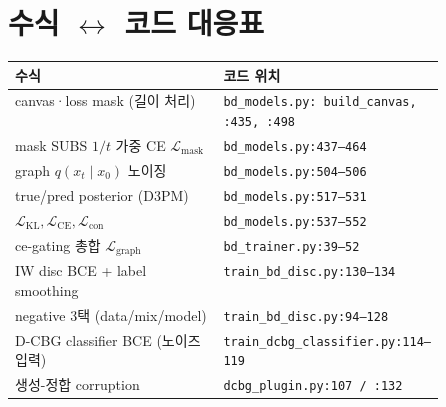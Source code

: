 \documentclass[11pt]{article}
\newcommand{\code}[1]{\texttt{\small #1}}
\newcommand{\xz}{x_0}
\newcommand{\xt}{x_t}
\theoremstyle{definition}
\begin{document}
\section{수식 $\leftrightarrow$ 코드 대응표}
\begin{center}
\renewcommand{\arraystretch}{1.2}
\begin{tabular}{@{}p{0.5\linewidth} l@{}}
\toprule
\textbf{수식} & \textbf{코드 위치}\\
\midrule
canvas·loss mask (길이 처리) & \code{bd\_models.py: build\_canvas, :435, :498}\\
mask SUBS $1/t$ 가중 CE $\mathcal L_{\text{mask}}$ & \code{bd\_models.py:437--464}\\
graph $q(\xt\mid\xz)$ 노이징 & \code{bd\_models.py:504--506}\\
true/pred posterior (D3PM) & \code{bd\_models.py:517--531}\\
$\mathcal L_{\text{KL}},\mathcal L_{\text{CE}},\mathcal L_{\text{con}}$ & \code{bd\_models.py:537--552}\\
ce-gating 총합 $\mathcal L_{\text{graph}}$ & \code{bd\_trainer.py:39--52}\\
IW disc BCE + label smoothing & \code{train\_bd\_disc.py:130--134}\\
negative 3택 (data/mix/model) & \code{train\_bd\_disc.py:94--128}\\
D-CBG classifier BCE (노이즈 입력) & \code{train\_dcbg\_classifier.py:114--119}\\
생성-정합 corruption & \code{dcbg\_plugin.py:107 / :132}\\
\bottomrule
\end{tabular}
\end{center}
\end{document}
